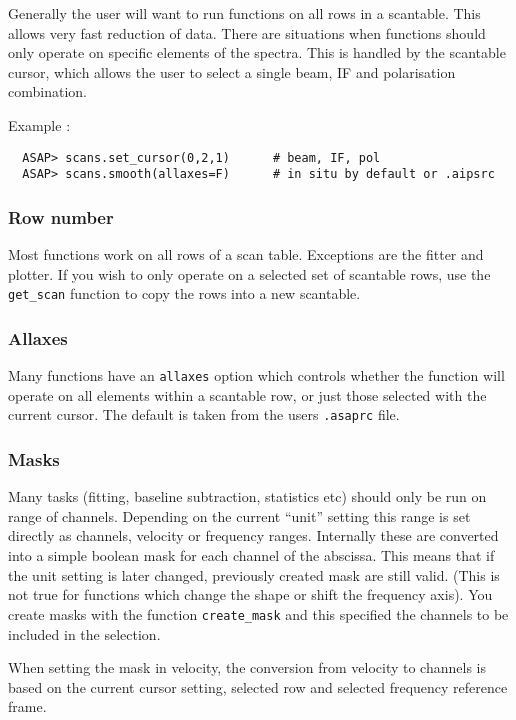 \documentclass[11pt]{article}
\newcommand{\cmd}[1]{{\tt #1}}
\begin{document}
Generally the user will want to run functions on all rows in a
scantable. This allows very fast reduction of data. There are situations
when functions should only operate on specific elements of the spectra. This
is handled by the scantable cursor, which allows the user to select a
single beam, IF and polarisation combination.

Example :

\begin{verbatim}
  ASAP> scans.set_cursor(0,2,1)      # beam, IF, pol
  ASAP> scans.smooth(allaxes=F)      # in situ by default or .aipsrc
\end{verbatim}

\subsubsection{Row number}

Most functions work on all rows of a scan table. Exceptions are the
fitter and plotter. If you wish to only operate on a selected set of
scantable rows, use the \cmd{get\_scan} function to copy the rows into
a new scantable.

\subsubsection{Allaxes}

Many functions have an \cmd{allaxes} option which controls whether the
function will operate on all elements within a scantable row, or just
those selected with the current cursor. The default is taken from the
users {\tt .asaprc} file.

\subsubsection{Masks}

Many tasks (fitting, baseline subtraction, statistics etc) should only
be run on range of channels. Depending on the current ``unit'' setting
this range is set directly as channels, velocity or frequency
ranges. Internally these are converted into a simple boolean mask for
each channel of the abscissa. This means that if the unit setting is
later changed, previously created mask are still valid. (This is not
true for functions which change the shape or shift the frequency axis).
You create masks with the function \cmd{create\_mask} and this specified
the channels to be included in the selection.

When setting the mask in velocity, the conversion from velocity
to channels is based on the current cursor setting, selected row and
selected frequency reference frame.
\end{document}
